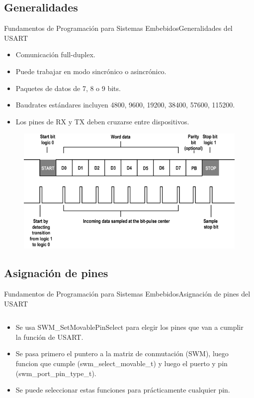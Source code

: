 \documentclass[aspectratio=169, xcolor=dvipsnames]{beamer}
\begin{document}
\subsection{Generalidades}
\begin{frame}{Fundamentos de Programación para Sistemas Embebidos}{Generalidades del USART}
\begin{itemize}
    \item Comunicación full-duplex.
    \item Puede trabajar en modo sincrónico o asincrónico.
    \item Paquetes de datos de 7, 8 o 9 bits.
    \item Baudrates estándares incluyen 4800, 9600, 19200, 38400, 57600, 115200.
    \item Los pines de RX y TX deben cruzarse entre dispositivos.
\end{itemize}
\begin{figure}
\centering
\includegraphics[width=0.45\linewidth]{resources/images/uart_frame.png}
\end{figure}
\end{frame}

\subsection{Asignación de pines}
\begin{frame}{Fundamentos de Programación para Sistemas Embebidos}{Asignación de pines del USART}
\begin{columns}
\begin{column}{0.5\textwidth}
\begin{itemize}
    \item Se usa \textcolor{myblue}{SWM\_SetMovablePinSelect} para elegir los pines que van a cumplir la función de USART.
    \item Se pasa primero el puntero a la matriz de conmutación (SWM), luego funcion que cumple (\textcolor{myblue}{swm\_select\_movable\_t}) y luego el puerto y pin (\textcolor{myblue}{swm\_port\_pin\_type\_t}).
    \item Se puede seleccionar estas funciones para prácticamente cualquier pin.
\end{itemize}
\end{column}
\begin{column}{0.5\textwidth}

\end{column}
\end{columns}
\end{frame}
\end{document}
